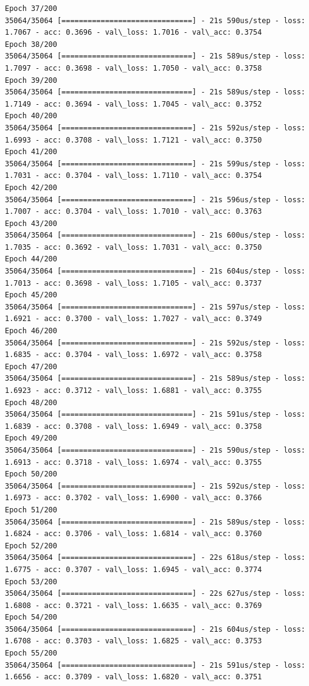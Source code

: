 \documentclass[11pt]{article}
\begin{document}
\begin{Verbatim}[commandchars=\\\{\}]
Epoch 37/200
35064/35064 [==============================] - 21s 590us/step - loss: 1.7067 - acc: 0.3696 - val\_loss: 1.7016 - val\_acc: 0.3754
Epoch 38/200
35064/35064 [==============================] - 21s 589us/step - loss: 1.7097 - acc: 0.3698 - val\_loss: 1.7050 - val\_acc: 0.3758
Epoch 39/200
35064/35064 [==============================] - 21s 589us/step - loss: 1.7149 - acc: 0.3694 - val\_loss: 1.7045 - val\_acc: 0.3752
Epoch 40/200
35064/35064 [==============================] - 21s 592us/step - loss: 1.6993 - acc: 0.3708 - val\_loss: 1.7121 - val\_acc: 0.3750
Epoch 41/200
35064/35064 [==============================] - 21s 599us/step - loss: 1.7031 - acc: 0.3704 - val\_loss: 1.7110 - val\_acc: 0.3754
Epoch 42/200
35064/35064 [==============================] - 21s 596us/step - loss: 1.7007 - acc: 0.3704 - val\_loss: 1.7010 - val\_acc: 0.3763
Epoch 43/200
35064/35064 [==============================] - 21s 600us/step - loss: 1.7035 - acc: 0.3692 - val\_loss: 1.7031 - val\_acc: 0.3750
Epoch 44/200
35064/35064 [==============================] - 21s 604us/step - loss: 1.7013 - acc: 0.3698 - val\_loss: 1.7105 - val\_acc: 0.3737
Epoch 45/200
35064/35064 [==============================] - 21s 597us/step - loss: 1.6921 - acc: 0.3700 - val\_loss: 1.7027 - val\_acc: 0.3749
Epoch 46/200
35064/35064 [==============================] - 21s 592us/step - loss: 1.6835 - acc: 0.3704 - val\_loss: 1.6972 - val\_acc: 0.3758
Epoch 47/200
35064/35064 [==============================] - 21s 589us/step - loss: 1.6923 - acc: 0.3712 - val\_loss: 1.6881 - val\_acc: 0.3755
Epoch 48/200
35064/35064 [==============================] - 21s 591us/step - loss: 1.6839 - acc: 0.3708 - val\_loss: 1.6949 - val\_acc: 0.3758
Epoch 49/200
35064/35064 [==============================] - 21s 590us/step - loss: 1.6913 - acc: 0.3718 - val\_loss: 1.6974 - val\_acc: 0.3755
Epoch 50/200
35064/35064 [==============================] - 21s 592us/step - loss: 1.6973 - acc: 0.3702 - val\_loss: 1.6900 - val\_acc: 0.3766
Epoch 51/200
35064/35064 [==============================] - 21s 589us/step - loss: 1.6824 - acc: 0.3706 - val\_loss: 1.6814 - val\_acc: 0.3760
Epoch 52/200
35064/35064 [==============================] - 22s 618us/step - loss: 1.6775 - acc: 0.3707 - val\_loss: 1.6945 - val\_acc: 0.3774
Epoch 53/200
35064/35064 [==============================] - 22s 627us/step - loss: 1.6808 - acc: 0.3721 - val\_loss: 1.6635 - val\_acc: 0.3769
Epoch 54/200
35064/35064 [==============================] - 21s 604us/step - loss: 1.6708 - acc: 0.3703 - val\_loss: 1.6825 - val\_acc: 0.3753
Epoch 55/200
35064/35064 [==============================] - 21s 591us/step - loss: 1.6656 - acc: 0.3709 - val\_loss: 1.6820 - val\_acc: 0.3751

\end{Verbatim}
\end{document}
